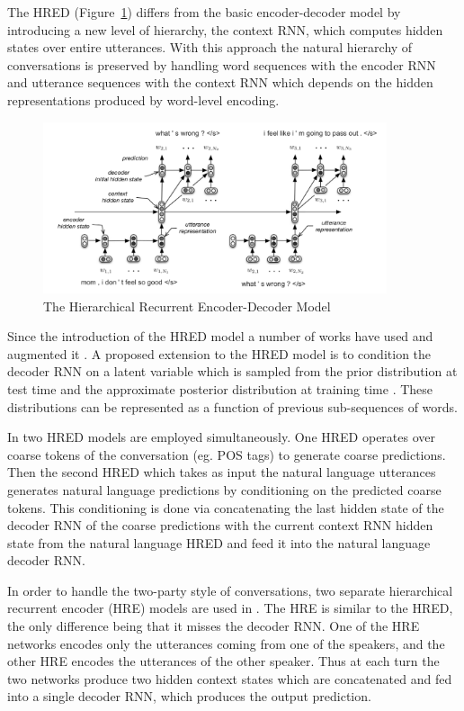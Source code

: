\documentclass[12pt]{article}
\begin{document}
The HRED (Figure~\ref{fig:HRED}) differs from the basic encoder-decoder model by introducing a new level of hierarchy, the context RNN, which computes hidden states over entire utterances. With this approach the natural hierarchy of conversations is preserved by handling word sequences with the encoder RNN and utterance sequences with the context RNN which depends on the hidden representations produced by word-level encoding.

\begin{figure}[H]
	\centering
	\includegraphics[width=0.9\textwidth]{pics/HRED.png}
	\caption{The Hierarchical Recurrent Encoder-Decoder Model \cite{Serban:2015}}
	\label{fig:HRED}
\end{figure}
Since the introduction of the HRED model a number of works have used and augmented it \cite{Serban_VHRED:2017,Serban_MrRNN:2017,Serban:2017,Shen:2017,Li_adversarial:2017}. A proposed extension to the HRED model is to condition the decoder RNN on a latent variable which is sampled from the prior distribution at test time and the approximate posterior distribution at training time \cite{Serban_VHRED:2017}. These distributions can be represented as a function of previous sub-sequences of words. 

In \cite{Serban_MrRNN:2017} two HRED models are employed simultaneously. One HRED operates over coarse tokens of the conversation (eg. POS tags) to generate coarse predictions. Then the second HRED which takes as input the natural language utterances generates natural language predictions by conditioning on the predicted coarse tokens. This conditioning is done via concatenating the last hidden state of the decoder RNN of the coarse predictions with the current context RNN hidden state from the natural language HRED and feed it into the natural language decoder RNN.

In order to handle the two-party style of conversations, two separate hierarchical recurrent encoder (HRE) models are used in \cite{Shen:2017}. The HRE is similar to the HRED, the only difference being that it misses the decoder RNN. One of the HRE networks encodes only the utterances coming from one of the speakers, and the other HRE encodes the utterances of the other speaker. Thus at each turn the two networks produce two hidden context states which are concatenated and fed into a single decoder RNN, which produces the output prediction.
\end{document}
